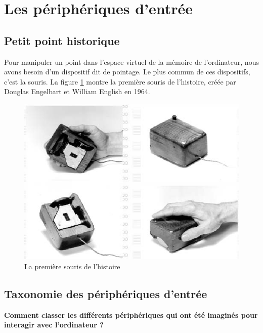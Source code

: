 \documentclass[
]{book}
\begin{document}
\hypertarget{les-puxe9riphuxe9riques-dentruxe9e}{%
\section{Les périphériques d'entrée}\label{les-puxe9riphuxe9riques-dentruxe9e}}

\hypertarget{petit-point-historique}{%
\subsection{Petit point historique}\label{petit-point-historique}}

Pour manipuler un point dans l'espace virtuel de la mémoire de
l'ordinateur, nous avons besoin d'un dispositif dit de pointage. Le plus
commun de ces dispositifs, c'est la souris. La figure
\ref{fig:Lapremieresouris} montre la première souris de l'histoire,
créée par Douglas Engelbart et William English en 1964.

\begin{figure}
\centering
\includegraphics{img/firstMouse.png}
\caption{\label{fig:Lapremieresouris}La première souris de l'histoire}
\end{figure}

\hypertarget{taxonomie-des-puxe9riphuxe9riques-dentruxe9e}{%
\subsection{Taxonomie des périphériques d'entrée}\label{taxonomie-des-puxe9riphuxe9riques-dentruxe9e}}

\textbf{Comment classer les différents périphériques qui ont été imaginés pour
interagir avec l'ordinateur ?}
\end{document}
